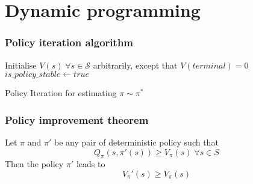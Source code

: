 \section{Dynamic programming} \label{policyimprovement}

\subsubsection{Policy iteration algorithm}

\begin{algorithm}[!htp]
	\SetAlgoLined
	\DontPrintSemicolon
	\LinesNumbered
	Initialise $V(s) \; \forall s \in \mathcal{S}$ arbitrarily, except that $V(terminal) = 0$\;
	$is\_policy\_stable \leftarrow true$\;
	\caption{Policy Iteration for estimating $\pi \sim \pi^*$}
	\label{policy_evaluation}
\end{algorithm}

\FloatBarrier

\subsubsection{Policy improvement theorem}

Let $\pi$ and $\pi'$ be any pair of deterministic policy such that 
\begin{equation} \label{eq:impr0}
	Q_\pi(s, \pi'(s)) \ge V_\pi(s) \; \forall s \in S
\end{equation}
Then the policy $\pi'$ leads to
\begin{equation} \label{eq:impr1}
V_\pi'(s) \ge V_\pi(s)
\end{equation}



